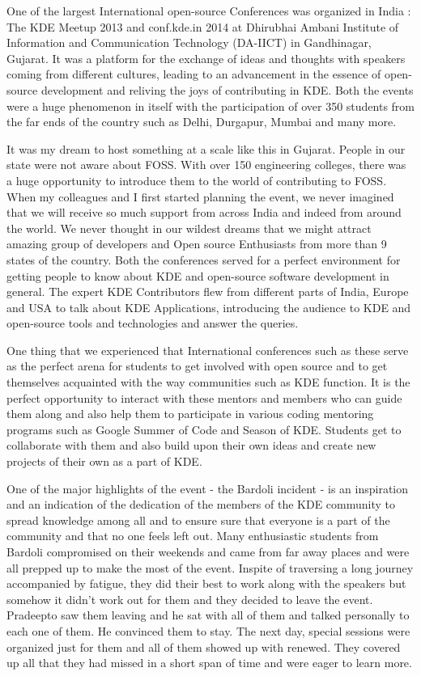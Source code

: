\authorbio{}

\noindent{}One of the largest International open-source Conferences was organized in India : The KDE Meetup 2013 and conf.kde.in 2014 at Dhirubhai Ambani Institute of Information and Communication Technology (DA-IICT) in Gandhinagar, Gujarat. It was a platform for the exchange of ideas and thoughts with speakers coming from different cultures, leading to an advancement in the essence of open-source development and reliving the joys of contributing in KDE. Both the events were a huge phenomenon in itself with the participation of over 350 students from the far ends of the country such as Delhi, Durgapur, Mumbai and many more. 

It was my dream to host something at a scale like this in Gujarat. People in our state were not aware about FOSS. With over 150 engineering colleges, there was a huge opportunity to introduce them to the world of contributing to FOSS. When my colleagues and I first started planning the event, we never imagined that we will receive so much support from across India and indeed from around the world. We never thought in our wildest dreams that we might attract amazing group of developers and Open source Enthusiasts from more than 9 states of the country. Both the conferences served for a perfect environment for getting people to know about KDE and open-source software development in general. The expert KDE Contributors flew from different parts of India, Europe and USA to talk about KDE Applications, introducing the audience to KDE and open-source tools and technologies and answer the queries. 

One thing that we experienced that International conferences such as these serve as the perfect arena for students to get involved with open source and to get themselves acquainted with the way communities such as KDE function. It is the perfect opportunity to interact with these mentors and members who can guide them along and also help them to participate in various coding mentoring programs such as Google Summer of Code and Season of KDE. Students get to collaborate with them and also build upon their own ideas and create new projects of their own as a part of KDE.

One of the major highlights of the event - the Bardoli incident - is an inspiration and an indication of the dedication of the members of the KDE community to spread knowledge among all and to ensure sure that everyone is a part of  the community and that no one feels left out. Many enthusiastic students from Bardoli compromised on their weekends and came from far away places and were all prepped up to make the most of the event. Inspite of traversing a long journey accompanied by fatigue, they did their best to work along with the speakers but somehow it didn’t work out for them and they decided to leave the event. Pradeepto saw them leaving and he sat with all of them and talked personally to each one of them. He convinced them to stay. The next day, special sessions were organized just for them and all of them showed up with renewed. They covered up all that they had missed in a short span of time and were eager to learn more.

